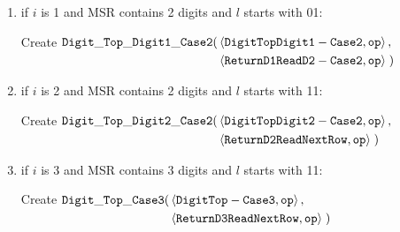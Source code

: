 \begin{itemize}
\begin{enumerate}[label=\alph*)]
        \item if $i$ is 1 and MSR contains 2 digits and $l$ starts with 01:

        Create
        $\begin{aligned}[t]
            {\tt Digit\_Top\_Digit1\_Case2}(& \left \langle {\tt DigitTopDigit1-Case2}, {\tt op} \right\rangle, & \\
                                & \left \langle {\tt ReturnD1ReadD2-Case2}, {\tt op} \right\rangle \;)
        \end{aligned}$
        \vspace{.5cm}


        \item if $i$ is 2 and MSR contains 2 digits and $l$ starts with 11:

        Create
        $\begin{aligned}[t]
            {\tt Digit\_Top\_Digit2\_Case2}(& \left \langle {\tt DigitTopDigit2-Case2}, {\tt op} \right\rangle, & \\
                                & \left \langle {\tt ReturnD2ReadNextRow},  {\tt op} \right\rangle \;)
        \end{aligned}$
        \vspace{.5cm}


        \item if $i$ is 3 and MSR contains 3 digits and $l$ starts with 11:

        Create
        $\begin{aligned}[t]
            {\tt Digit\_Top\_Case3}(& \left \langle {\tt DigitTop-Case3},      {\tt op} \right\rangle, & \\
                            & \left \langle {\tt ReturnD3ReadNextRow}, {\tt op} \right\rangle \;)
        \end{aligned}$
        \vspace{.5cm}


    \end{enumerate}

\end{itemize}
\vspace{1cm}